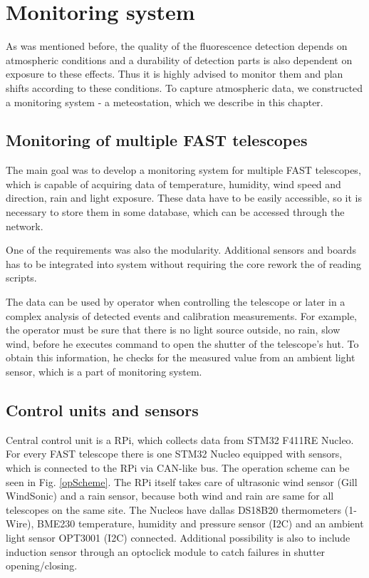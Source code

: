 
\chapter{Monitoring system}
As was mentioned before, the quality of the fluorescence detection depends on atmospheric conditions and a durability of detection parts is also dependent on exposure to these effects. Thus it is highly advised to monitor them and plan shifts according to these conditions. To capture atmospheric data, we constructed a monitoring system - a meteostation, which we describe in this chapter.
\section{Monitoring of multiple FAST telescopes}
The main goal was to develop a monitoring system for multiple FAST telescopes, which is capable of acquiring data of temperature, humidity, wind speed and direction, rain and light exposure. These data have to be easily accessible, so it is necessary to store them in some database, which can be accessed through the network.
\par
One of the requirements was also the modularity. Additional sensors and boards has to be integrated into system without requiring the core rework the of reading scripts.

\par
The data can be used by operator when controlling the telescope or later in a complex analysis of detected events and calibration measurements. For example, the operator must be sure that there is no light source outside, no rain, slow wind, before he executes command to open the shutter of the telescope's hut. To obtain this information, he checks for the measured value from an ambient light sensor, which is a part of monitoring system.
\par

\section{Control units and sensors}
Central control unit is a RPi, which collects data from STM32 F411RE Nucleo. For every FAST telescope there is one STM32 Nucleo equipped with sensors, which is connected to the RPi via CAN-like bus. The operation scheme can be seen in Fig. \ref{opScheme}. The RPi itself takes care of ultrasonic wind sensor (Gill WindSonic) and a rain sensor, because both wind and rain are same for all telescopes on the same site. The Nucleos have dallas DS18B20 thermometers (1-Wire), BME230 temperature, humidity and pressure sensor (I2C) and an ambient light sensor OPT3001 (I2C) connected. Additional possibility is also to include induction sensor through an optoclick module to catch failures in shutter opening/closing.


